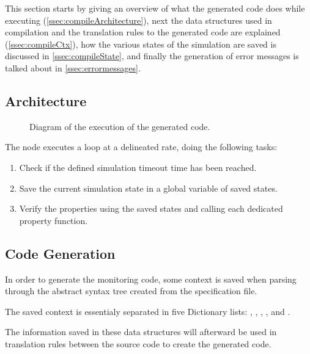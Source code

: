 This section starts by giving an overview of what the generated code does while executing (\autoref{ssec:compileArchitecture}), next the data structures used in compilation and the translation rules to the generated code are explained (\autoref{ssec:compileCtx}), how the various states of the simulation are saved is discussed in \autoref{ssec:compileState}, and finally the generation of error messages is talked about in \autoref{ssec:errormessages}. 

\subsection{Architecture}
\label{ssec:compileArchitecture}

\begin{figure}[htb]
\caption{Diagram of the execution of the generated code.} \label{fig:gencodediag}
\end{figure}

The node executes a loop at a delineated rate, doing the following tasks:

\begin{enumerate}
    \item Check if the defined simulation timeout time has been reached.
    \item Save the current simulation state in a global variable of saved states.
    \item Verify the properties using the saved states and calling each dedicated property function.
\end{enumerate}


\subsection{Code Generation}
\label{ssec:compileCtx}

In order to generate the monitoring code, some context is saved when parsing through the abstract syntax tree created from the specification file.

The saved context is essentialy separated in five Dictionary lists: , , , , and .

The information saved in these data structures will afterward be used in translation rules between the source code to create the generated code.


